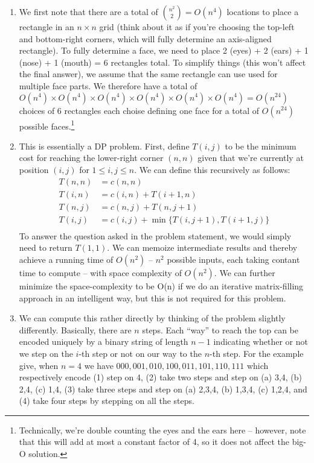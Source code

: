 \documentclass[12pt]{article}
\begin{document}
\begin{enumerate}[label=(\alph*)]
  \item We first note that there are a total of ${n^2 \choose 2} = O(n^4)$ locations to place a rectangle in an $n \times n$ grid (think about it as if you're choosing the top-left and bottom-right corners, which will fully determine an axis-aligned rectangle). To fully determine a face, we need to place 2 (eyes) + 2 (ears) + 1 (nose) + 1 (mouth) = 6 rectangles total. To simplify things (this won't affect the final answer), we assume that the same rectangle can use used for multiple face parts. We therefore have a total of $O(n^4)\times O(n^4) \times O(n^4) \times O(n^4) \times O(n^4) \times O(n^4)  = O(n^{24})$ choices of 6 rectangles each choise defining one face for a total of $O(n^{24})$ possible faces.\footnote{Technically, we're double counting the eyes and the ears here -- however, note that this will add at most a constant factor of 4, so it does not affect the big-O solution.}

  \item This is essentially a DP problem. First, define $T(i,j)$ to be the minimum cost for reaching the lower-right corner $(n,n)$ given that we're currently at position $(i,j)$ for $1 \leq i, j\leq n$. We can define this recursively as follows:
  \begin{align*}
    T(n,n) &= c(n,n) \\
    T(i,n) &= c(i,n) + T(i + 1, n) \\
    T(n,j) &= c(n,j) + T(n, j + 1) \\ 
    T(i,j) &= c(i,j) + \min\{ T(i, j+1), T(i+1, j) \} \\
  \end{align*}
  To answer the question asked in the problem statement, we would simply need to return $T(1,1)$. We can memoize intermediate results and thereby achieve a running time of $O(n^2)$ -- $n^2$ possible inputs, each taking contant time to compute -- with space complexity of $O(n^2)$. We can further minimize the space-complexity to be O(n) if we do an iterative matrix-filling approach in an intelligent way, but this is not required for this problem.

  \item We can compute this rather directly by thinking of the problem slightly differently. Basically, there are $n$ steps. Each ``way'' to reach the top can be encoded uniquely by a binary string of length $n-1$ indicating whether or not we step on the $i$-th step or not on our way to the $n$-th step. For the example give, when $n = 4$ we have $000, 001, 010, 100, 011, 101, 110, 111$ which respectively encode (1) step on 4, (2) take two steps and step on (a) 3,4, (b) 2,4, (c) 1,4, (3) take three steps and step on (a) 2,3,4, (b) 1,3,4, (c) 1,2,4, and (4) take four steps by stepping on all the steps.


\end{enumerate}
\end{document}
